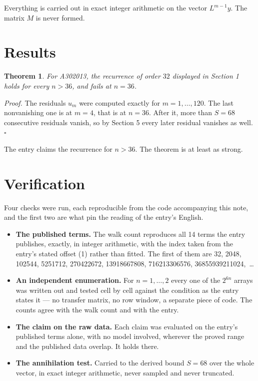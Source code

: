 \documentclass[11pt]{article}
\newtheorem{theorem}{Theorem}
\theoremstyle{definition}
\begin{document}
Everything is carried out in exact integer arithmetic on the vector $L^{m-1}y$. The matrix $M$ is never formed.

\section{Results}

\begin{theorem} For A302013, the recurrence of order $32$ displayed in Section 1 holds for every $n > 36$, and fails at $n = 36$.\end{theorem}

{\itshape Proof.} The residuals $u_m$ were computed exactly for $m = 1,\dots,120$. The last nonvanishing one is at $m = 4$, that is at $n = 36$. After it, more than $S = 68$ consecutive residuals vanish, so by Section 5 every later residual vanishes as well. $\square$

The entry claims the recurrence for $n > 36$. The theorem is at least as strong.

\section{Verification}

Four checks were run, each reproducible from the code accompanying this note, and the first two are what pin the reading of the entry's English.

\begin{itemize}

\item {\bfseries The published terms.} The walk count reproduces all 14 terms the entry publishes, exactly, in integer arithmetic, with the index taken from the entry's stated offset (1) rather than fitted. The first of them are 32, 2048, 102544, 5251712, 270422672, 13918667808, 716213306576, 36855939211024,~\dots

\item {\bfseries An independent enumeration.} For $n = 1,\dots,2$ every one of the $2^{6n}$ arrays was written out and tested cell by cell against the condition as the entry states it --- no transfer matrix, no row window, a separate piece of code. The counts agree with the walk count and with the entry.

\item {\bfseries The claim on the raw data.} Each claim was evaluated on the entry's published terms alone, with no model involved, wherever the proved range and the published data overlap. It holds there.

\item {\bfseries The annihilation test.} Carried to the derived bound $S = 68$ over the whole vector, in exact integer arithmetic, never sampled and never truncated.

\end{itemize}
\end{document}
